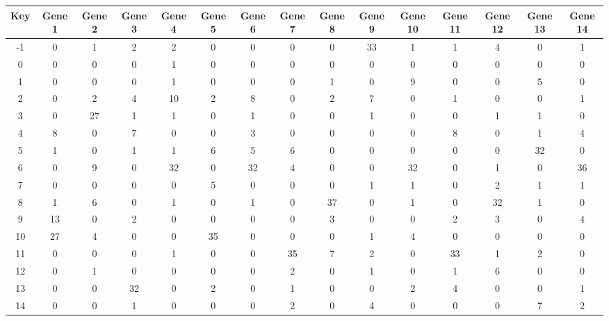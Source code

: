 \begin{tabular}{|c|c|c|c|c|c|c|c|c|c|c|c|c|c|c|}
\hline
Key & Gene 1 & Gene 2 & Gene 3 & Gene 4 & Gene 5 & Gene 6 & Gene 7 & Gene 8 & Gene 9 & Gene 10 & Gene 11 & Gene 12 & Gene 13 & Gene 14 \\
\hline
-1 & 0 & 1 & 2 & 2 & 0 & 0 & 0 & 0 & 33 & 1 & 1 & 4 & 0 & 1 \\
0 & 0 & 0 & 0 & 1 & 0 & 0 & 0 & 0 & 0 & 0 & 0 & 0 & 0 & 0 \\
1 & 0 & 0 & 0 & 1 & 0 & 0 & 0 & 1 & 0 & 9 & 0 & 0 & 5 & 0 \\
2 & 0 & 2 & 4 & 10 & 2 & 8 & 0 & 2 & 7 & 0 & 1 & 0 & 0 & 1 \\
3 & 0 & 27 & 1 & 1 & 0 & 1 & 0 & 0 & 1 & 0 & 0 & 1 & 1 & 0 \\
4 & 8 & 0 & 7 & 0 & 0 & 3 & 0 & 0 & 0 & 0 & 8 & 0 & 1 & 4 \\
5 & 1 & 0 & 1 & 1 & 6 & 5 & 6 & 0 & 0 & 0 & 0 & 0 & 32 & 0 \\
6 & 0 & 9 & 0 & 32 & 0 & 32 & 4 & 0 & 0 & 32 & 0 & 1 & 0 & 36 \\
7 & 0 & 0 & 0 & 0 & 5 & 0 & 0 & 0 & 1 & 1 & 0 & 2 & 1 & 1 \\
8 & 1 & 6 & 0 & 1 & 0 & 1 & 0 & 37 & 0 & 1 & 0 & 32 & 1 & 0 \\
9 & 13 & 0 & 2 & 0 & 0 & 0 & 0 & 3 & 0 & 0 & 2 & 3 & 0 & 4 \\
10 & 27 & 4 & 0 & 0 & 35 & 0 & 0 & 0 & 1 & 4 & 0 & 0 & 0 & 0 \\
11 & 0 & 0 & 0 & 1 & 0 & 0 & 35 & 7 & 2 & 0 & 33 & 1 & 2 & 0 \\
12 & 0 & 1 & 0 & 0 & 0 & 0 & 2 & 0 & 1 & 0 & 1 & 6 & 0 & 0 \\
13 & 0 & 0 & 32 & 0 & 2 & 0 & 1 & 0 & 0 & 2 & 4 & 0 & 0 & 1 \\
14 & 0 & 0 & 1 & 0 & 0 & 0 & 2 & 0 & 4 & 0 & 0 & 0 & 7 & 2 \\
\hline
\end{tabular}
